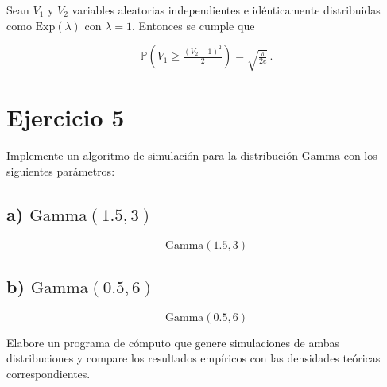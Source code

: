 \documentclass[10pt,a4paper]{article}
\let\ge\geqslant
\let\geq\geqslant
\let\ge\geq
\let\oldsection\section
\renewcommand{\section}{%
      \clearpage
      \thispagestyle{myfancy}%
      \oldsection
    }
\begin{document}
    Sean \(V_1\) y \(V_2\) variables aleatorias independientes e
idénticamente distribuidas como \(\text{Exp}(\lambda)\) con
\(\lambda = 1\). Entonces se cumple que

\[
\mathbb{P}\!\left( V_{1} \ge \tfrac{(V_{2}-1)^{2}}{2} \right)
= \sqrt{\tfrac{\pi}{2e}}\,.
\]

    \hypertarget{ejercicio-5}{%
\section{Ejercicio 5}\label{ejercicio-5}}

    Implemente un algoritmo de simulación para la distribución
\(\text{Gamma}\) con los siguientes parámetros:

    \hypertarget{a-textgamma1.5-3}{%
\subsection{\texorpdfstring{a)
\(\text{Gamma}(1.5, 3)\)}{a) \textbackslash text\{Gamma\}(1.5, 3)}}\label{a-textgamma1.5-3}}

    \[
\text{Gamma}(1.5, 3)
\]

    \hypertarget{b-textgamma0.5-6}{%
\subsection{\texorpdfstring{b)
\(\text{Gamma}(0.5, 6)\)}{b) \textbackslash text\{Gamma\}(0.5, 6)}}\label{b-textgamma0.5-6}}

    \[
\text{Gamma}(0.5, 6)
\]

    Elabore un programa de cómputo que genere simulaciones de ambas
distribuciones y compare los resultados empíricos con las densidades
teóricas correspondientes.


    
    
    
\end{document}
